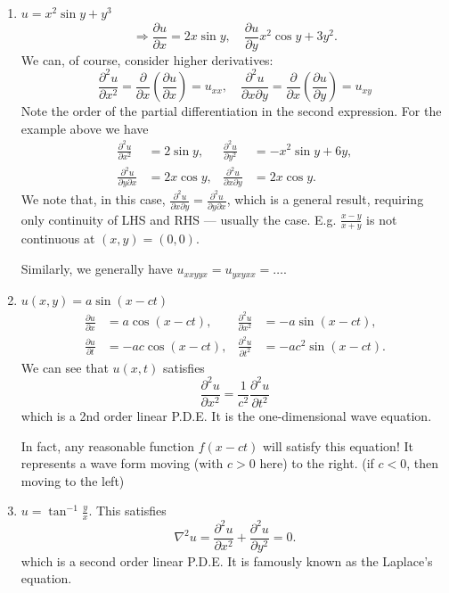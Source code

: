 \documentclass[12pt]{report}
\theoremstyle{definition}
\begin{document}
\begin{enumerate}[label = (\roman*)]
    \item $u = x^{2}\sin{y} + y^{3}$\[
        \Rightarrow{}\frac{\partial u}{\partial x} = 2x\sin{y},\quad
        \frac{\partial u}{\partial y} x^{2}\cos{y} + 3y^{2}.
    \]
    We can, of course, consider higher derivatives:\[
        \frac{\partial^{2}u}{\partial x^{2}} 
        = \frac{\partial }{\partial x} \left(\frac{\partial u}{\partial x} \right) 
        = u_{xx}, \quad
        \frac{\partial^{2}u}{\partial x \partial y} 
        = \frac{\partial}{\partial x} \left(\frac{\partial u}{\partial y} \right) 
        = u_{xy}
    \]
    Note the order of the partial differentiation in the second expression.
    For the example above we have\[
        \begin{align*}
            \frac{\partial^{2}u}{\partial x^{2}} & = 2\sin{y}, & \frac{\partial^{2}u}{\partial y^{2}} & = -x^{2}\sin{y} + 6y, \\ 
            \frac{\partial^{2}u}{\partial y \partial x} & = 2x\cos{y}, & \frac{\partial^{2}u}{\partial x \partial y} & = 2x\cos{y}.
        \end{align*}
    \]
    We note that, in this case, $\frac{\partial^{2}u}{\partial x \partial y}
    = \frac{\partial^{2}u}{\partial y \partial x} $, which is a general result,
    requiring only continuity of LHS and RHS --- usually the case.
    E.g. $\frac{x-y}{x+y}$ is not continuous at $(x,y) = (0,0)$.

    Similarly, we generally have $u_{xxyyx} = u_{yxyxx} = \ldots$.

\item $u(x,y) = a\sin{(x - ct)}$\[
    \begin{align*}
        \frac{\partial u}{\partial x} & = a\cos{(x-ct)}, & \frac{\partial^{2}u}{\partial x^{2}} & = -a\sin{(x-ct)}, \\
        \frac{\partial u}{\partial t} & = -ac\cos{(x-ct)}, & \frac{\partial^{2}u}{\partial t^{2}} & = -ac^{2}\sin{(x-ct)}.
    \end{align*}
\]
We can see that $u(x,t)$ satisfies\[
    \frac{\partial^{2}u}{\partial x^{2}} = \frac{1}{c^{2}} \frac{\partial^{2}u}{\partial t^{2}} 
\]which is a 2nd order linear P.D.E.
It is the one-dimensional wave equation.

In fact, any reasonable function $f(x-ct)$ will satisfy this equation!
It represents a wave form moving (with $c>0$ here) to the right.
(if $c<0$, then moving to the left)

\item $u = \tan^{-1}{\frac{y}{x}}$.
    This satisfies\[
        \nabla^{2} u = \frac{\partial^{2}u}{\partial x^{2}} + \frac{\partial^{2}u}{\partial y^{2}} = 0.
    \]which is a second order linear P.D.E.
    It is famously known as the Laplace's equation.
\end{enumerate}
\end{document}
